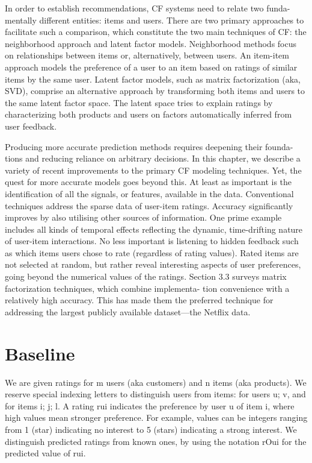 In order to establish recommendations, CF systems need to relate two funda- mentally different entities: items and users. There are two primary approaches to facilitate such a comparison, which constitute the two main techniques of CF: the neighborhood approach and latent factor models. Neighborhood methods focus on relationships between items or, alternatively, between users. An item-item approach models the preference of a user to an item based on ratings of similar items by the same user. Latent factor models, such as matrix factorization (aka, SVD), comprise an alternative approach by transforming both items and users to the same latent factor space. The latent space tries to explain ratings by characterizing both products and users on factors automatically inferred from user feedback.

Producing more accurate prediction methods requires deepening their founda- tions and reducing reliance on arbitrary decisions. In this chapter, we describe a variety of recent improvements to the primary CF modeling techniques. Yet, the quest for more accurate models goes beyond this. At least as important is the identification of all the signals, or features, available in the data. Conventional techniques address the sparse data of user-item ratings. Accuracy significantly improves by also utilising other sources of information. One prime example includes all kinds of temporal effects reflecting the dynamic, time-drifting nature of user-item interactions. No less important is listening to hidden feedback such as which items users chose to rate (regardless of rating values). Rated items are not selected at random, but rather reveal interesting aspects of user preferences, going beyond the numerical values of the ratings.
Section 3.3 surveys matrix factorization techniques, which combine implementa- tion convenience with a relatively high accuracy. This has made them the preferred technique for addressing the largest publicly available dataset—the Netflix data.

\section{Baseline}

We are given ratings for m users (aka customers) and n items (aka products). We reserve special indexing letters to distinguish users from items: for users u; v, and for items i; j; l. A rating rui indicates the preference by user u of item i, where high values mean stronger preference. For example, values can be integers ranging from 1 (star) indicating no interest to 5 (stars) indicating a strong interest. We distinguish predicted ratings from known ones, by using the notation rOui for the predicted value of rui.

